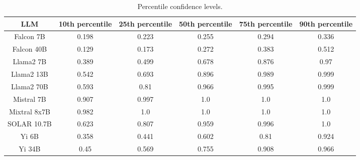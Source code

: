 \begin{table*}
\centering
\begin{tabular}{c|c|c|c|c|c}
LLM & 10th percentile & 25th percentile & 50th percentile & 75th percentile & 90th percentile\\ \hline
Falcon 7B & 0.198 & 0.223 & 0.255 & 0.294 & 0.336\\
Falcon 40B & 0.129 & 0.173 & 0.272 & 0.383 & 0.512\\
Llama2 7B & 0.389 & 0.499 & 0.678 & 0.876 & 0.97\\
Llama2 13B & 0.542 & 0.693 & 0.896 & 0.989 & 0.999\\
Llama2 70B & 0.593 & 0.81 & 0.966 & 0.995 & 0.999\\
Mistral 7B & 0.907 & 0.997 & 1.0 & 1.0 & 1.0\\
Mixtral 8x7B & 0.982 & 1.0 & 1.0 & 1.0 & 1.0\\
SOLAR 10.7B & 0.623 & 0.807 & 0.959 & 0.996 & 1.0\\
Yi 6B & 0.358 & 0.441 & 0.602 & 0.81 & 0.924\\
Yi 34B & 0.45 & 0.569 & 0.755 & 0.908 & 0.966\\
\hline
\end{tabular}
\caption{Percentile confidence levels.}
\label{tab:percentile_conf}
\end{table*}
